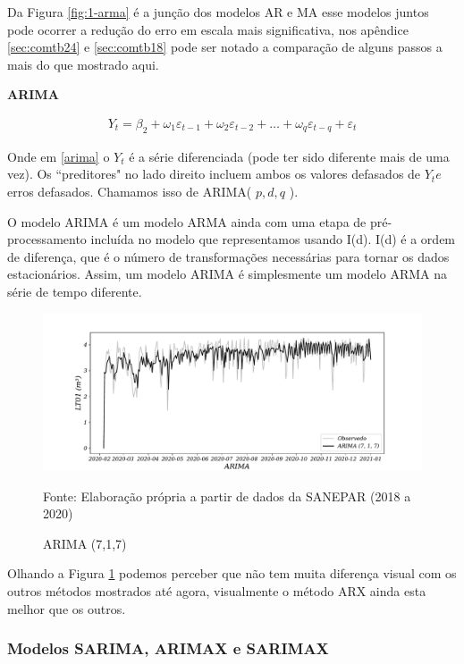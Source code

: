 Da Figura \ref{fig:1-arma} é a junção dos modelos AR e MA esse modelos juntos pode ocorrer a redução do erro em escala mais significativa, nos apêndice \ref{sec:comtb24} e \ref{sec:comtb18} pode ser notado a comparação de alguns passos a mais do que mostrado aqui.

\textbf{ARIMA}

\begin{eqnarray}
	Y_t = \beta_2 + \omega_1\varepsilon_{t-1} + \omega_2 \varepsilon_{t-2} +\ldots+ \omega_q \varepsilon_{t-q} + \varepsilon_t \label{arima}
\end{eqnarray}


Onde em \eqref{arima} o $Y_t$ é a série diferenciada (pode ter sido diferente mais de uma vez). Os ``preditores" no lado direito incluem ambos os valores defasados de $Y_t e$ erros defasados. Chamamos isso de ARIMA( $p, d, q$ ).

O modelo ARIMA é um modelo ARMA ainda com uma etapa de pré-processamento incluída no modelo que representamos usando I(d). I(d) é a ordem de diferença, que é o número de transformações necessárias para tornar os dados estacionários. Assim, um modelo ARIMA é simplesmente um modelo ARMA na série de tempo diferente.

\begin{figure}[H]
	\centering
	\caption{ARIMA (7,1,7)  }
	\label{fig:1-arima}
	\includegraphics[width=1\linewidth]{Modelos/Figuras/0-ARIMA}
	
	Fonte: Elaboração própria a partir de dados da SANEPAR (2018 a 2020)
\end{figure}

Olhando a Figura \ref{fig:1-arima} podemos perceber que não tem muita diferença visual com os outros métodos mostrados até agora, visualmente o método ARX ainda esta melhor que os outros.  


\subsubsection{Modelos SARIMA, ARIMAX e SARIMAX}

